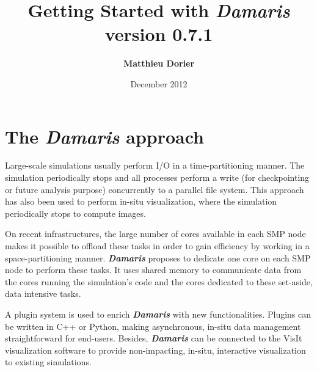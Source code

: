 \documentclass[11pt]{report}
\newcommand{\Damaris}{\emph{\textbf{Damaris}}}
\begin{document}
\title{\Huge{ 
	 Getting Started with \Damaris{}} \\
	\normalsize{} version 0.7.1}
\author{\textbf{Matthieu Dorier}}
\date{December 2012}
\maketitle

\setcounter{tocdepth}{1}
\tableofcontents

\chapter*{The \Damaris{} approach}

Large-scale simulations usually perform I/O in a time-partitioning manner.
The simulation periodically stops and all processes perform a write (for checkpointing
or future analysis purpose) concurrently to a parallel file system. This approach has also been
used to perform in-situ visualization, where the simulation periodically stops to compute images.

On recent infrastructures, the large number of cores available in each SMP node makes
it possible to offload these tasks in order to gain efficiency by working in a space-partitioning manner.
\Damaris{} proposes to dedicate one core on each SMP node to perform these tasks.
It uses shared memory to communicate data from the cores running the simulation's code and
the cores dedicated to these set-aside, data intensive tasks.

A plugin system is used to enrich \Damaris{} with new functionalities. Plugins can be written
in C++ or Python, making asynchronous, in-situ data management straightforward for end-users.
Besides, \Damaris{} can be connected to the VisIt visualization software to provide
non-impacting, in-situ, interactive visualization to existing simulations.



\end{document}
